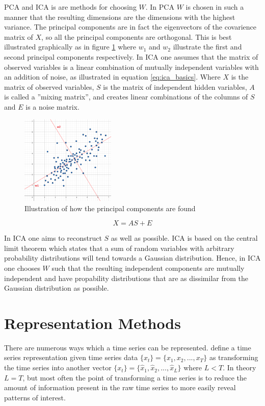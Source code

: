 PCA and ICA is are methods for choosing $W$. 
In PCA $W$ is chosen in such a manner that the resulting dimensions are the dimensions with the highest variance.
The principal components are in fact the eigenvectors of the covarience matrix of $X$, so all the principal components are orthogonal. 
This is best illustrated graphically as in figure \ref{fig:pca_illustrated} where $w_1$ and $w_2$ illustrate the first and second principal components respectively.
In ICA one assumes that the matrix of observed variables is a linear combination of mutually independent variables with an addition of noise, as illustrated in equation \ref{eq:ica_basics}. 
Where $X$ is the matrix of observed variables, $S$ is the matrix of independent hidden variables, $A$ is called a ''mixing matrix'', and creates linear combinations of the columns of $S$ and $E$ is a noise matrix. 

\begin{figure}
    \begin{center}
    \includegraphics[width=0.4\textwidth]{tsc/pca_illustrated.png}
    \end{center}
    \caption{Illustration of how the principal components are found} 
    \label{fig:pca_illustrated}
\end{figure} 

\begin{equation}
    X = A S + E
    \label{eq:ica_basics}
\end{equation}

In ICA one aims to reconstruct $S$ as well as possible.
ICA is based on the central limit theorem which states that a sum of random variables with arbitrary probability distributions will tend towards a Gaussian distribution. 
Hence, in ICA one chooses $W$ such that the resulting independent components are mutually independent and have propability distributions that are as dissimilar from the Gaussian distribution as possible.

\section{Representation Methods} \label{sec:rep_methods}
There are numerous ways which a time series can be represented. 
\textcite{tsc_rev} define a time series representation given time series data $\{x_t\} = \{x_1, x_2, ... ,x_T\}$ as transforming the time series into another vector $\{x_t\} = \{\hat{x}_1, \hat{x}_2, ... ,\hat{x}_L\}$ where $L < T$. 
In theory $L=T$, but most often the point of transforming a time series is to reduce the amount of information present in the raw time series to more easily reveal patterns of interest. \bigskip

